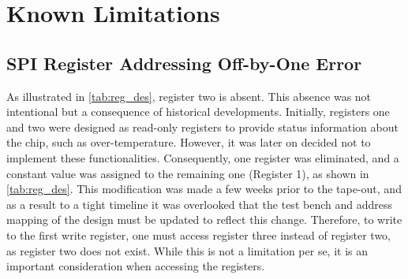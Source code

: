 \section{Known Limitations}
\label{sec:limitations}

\subsection{SPI Register Addressing Off-by-One Error}
\label{subsec:spi_register_offset}
As illustrated in \autoref{tab:reg_des}, register two is absent. This absence was not intentional but a consequence of historical developments. Initially, registers one and two were designed as read-only registers to provide status information about the chip, such as over-temperature. However, it was later on decided not to implement these functionalities. Consequently, one register was eliminated, and a constant value was assigned to the remaining one (Register 1), as shown in \autoref{tab:reg_des}.
This modification was made a few weeks prior to the tape-out, and as a result to a tight timeline it was overlooked that the test bench and address mapping of the design must be updated to reflect this change. Therefore, to write to the first write register, one must access register three instead of register two, as register two does not exist. While this is not a limitation per se, it is an important consideration when accessing the registers.

